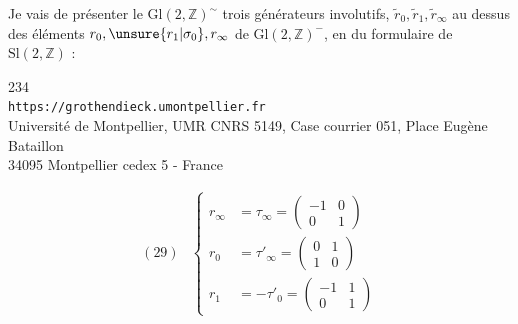 Je vais  de présenter le  
$\mathrm{Gl}(2,\mathbb Z)^{\sim}$  trois générateurs involutifs,
 $\widetilde r_0,\widetilde r_1,\widetilde r_\infty$ au dessus des éléments
$r_0,\unsure{r_1|\sigma_0},r_\infty$ de $\mathrm{Gl}(2,\mathbb Z)^{-}$, en  du formulaire de $\mathrm{Sl}(2,\mathbb Z)$ :


\begin{center}
234\\
\texttt{https://grothendieck.umontpellier.fr}\\
Université de Montpellier, UMR CNRS 5149, Case courrier 051, Place Eugène Bataillon\\
34095 Montpellier cedex 5 - France
\end{center}


\[
\begin{array}{ll}
(29)&\left\{
\begin{aligned}
r_\infty&=\tau_\infty=\begin{pmatrix}-1&0\\0&1\end{pmatrix}\\
r_0&=\tau'_\infty=\begin{pmatrix}0&1\\1&0\end{pmatrix}\\
r_1&=-\tau'_0=\begin{pmatrix}-1&1\\0&1\end{pmatrix}
\end{aligned}
\right.
\end{array}
\]
\margin{$\left[\begin{array}{ll}
(30)&\left\{
\begin{aligned}
r_0(\rho)&=\rho^{-1},\quad r_0(\sigma)=\sigma^{-1}\\
r_1&=\rho^{-1}r_0=r_0\rho\\
r_\infty&=\sigma r_0=r_0\sigma^{-1}
\end{aligned}\right.
\end{array}\right.$}

